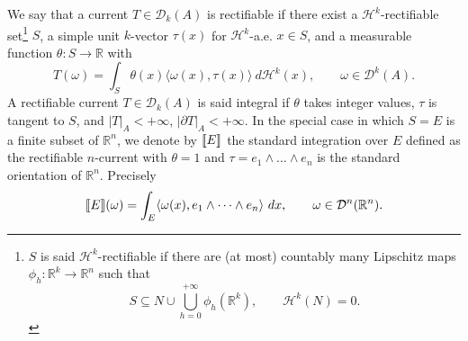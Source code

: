 \documentclass[a4paper,11pt]{article}
\numberwithin{equation}{section}
\newcommand{\jump}[1]{\text{{\rm \textlbrackdbl}}{#1}\text{{\rm \textrbrackdbl}}}
\newcommand{\R}{\mathbb{R}}
\begin{document}
We say that a current $T\in \mathcal D_k(A)$ is rectifiable if there exist a $\mathcal H^k$-rectifiable set\footnote{$S$ is said $\mathcal H^k$-rectifiable if there are (at most) countably many Lipschitz maps $\phi_h:\R^k\rightarrow \R^n$ such that 
	$$S\subseteq N\cup\bigcup_{h=0}^{+\infty} \phi_h(\R^k),\qquad \mathcal H^k(N)=0.$$
	} $S$, a simple unit $k$-vector $\tau(x)$ 
for $\mathcal H^k$-a.e.
$x\in S$, and a measurable function $\theta:S\rightarrow \R$ with
\begin{equation*}\label{eq:S_rectif}
	T(\omega)=\int_S\theta(x)\langle\omega(x),\tau(x)\rangle~ 
	d\mathcal H^{k}(x),\qquad \omega\in \mathcal D^k(A).
\end{equation*}
A rectifiable current  $T\in \mathcal D_k(A)$ is said integral if $\theta$ takes integer values, $\tau$ is tangent to $S$, and   $|T|_A<+\infty$, $|\partial T|_A<+\infty$.
In the special case in which $S=E$ is a finite subset of $\R^n$,  we denote by $\jump{E}$ the standard integration over $E$ defined as the rectifiable $n$-current with $\theta=1$ and $\tau=e_1\wedge\dots\wedge e_n$ is the standard orientation of $\R^n$. Precisely
$$	\jump{E}(\omega)=\int_E\langle\omega(x),e_1\wedge\dots\wedge e_n\rangle~ 
dx,\qquad \omega\in \mathcal D^n(\R^n). $$  
%
\end{document}
